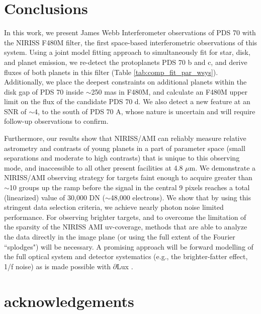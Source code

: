 \documentclass[11pt,twocolumn,twocolappendix]{aastex631}
\begin{document}
\section{Conclusions} 
\label{sec:con}

In this work, we present James Webb Interferometer observations of PDS 70 with the NIRISS F480M filter, the first space-based interferometric observations of this system. Using a joint model fitting approach to simultaneously fit for star, disk, and planet emission, we re-detect the protoplanets PDS 70 b and c, and derive fluxes of both planets in this filter (Table \ref{tab:comp_fit_par_wsys}). Additionally, we place the deepest constraints on additional planets within the disk gap of PDS 70 inside $\sim$250 mas in F480M, and calculate an F480M upper limit on the flux of the candidate PDS 70 d. We also detect a new feature at an SNR of $\sim$4, to the south of PDS 70 A, whose nature is uncertain and will require follow-up observations to confirm. %


Furthermore, our results show that NIRISS/AMI can reliably measure relative astrometry and contrasts of young planets in a part of parameter space (small separations and moderate to high contrasts) that is unique to this observing mode, and inaccessible to all other present facilities at 4.8 $\mu$m.
We demonstrate a NIRISS/AMI observing strategy for targets faint enough to acquire greater than $\sim$10 groups up the ramp before the signal in the central 9 pixels reaches a total (linearized) value of 30,000 DN ($\sim$48,000 electrons). {We show that by using this stringent data selection criteria, we achieve nearly photon noise limited performance.}
{For observing brighter targets, and to overcome} the limitation of the sparsity of the NIRISS AMI uv-coverage, methods that are able to analyze the data directly in the image plane (or using the full extent of the Fourier ``splodges") will be necessary. A promising approach will be forward modelling of the full optical system and detector systematics (e.g., the brighter-fatter effect, 1/f noise) as is made possible with $\partial$Lux \citep{Desdoigts2023DifferentiableOW}. 



\section{acknowledgements}
\end{document}
